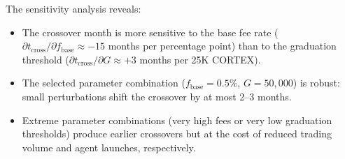The sensitivity analysis reveals:
\begin{itemize}
  \item The crossover month is more sensitive to the base fee rate
    ($\partial t_{\text{cross}} / \partial f_{\text{base}} \approx -15$
    months per percentage point) than to the graduation threshold
    ($\partial t_{\text{cross}} / \partial G \approx +3$ months per 25K CORTEX).
  \item The selected parameter combination ($f_{\text{base}} = 0.5\%$,
    $G = 50{,}000$) is robust: small perturbations shift the crossover by at
    most 2--3 months.
  \item Extreme parameter combinations (very high fees or very low graduation
    thresholds) produce earlier crossovers but at the cost of reduced trading
    volume and agent launches, respectively.
\end{itemize}

